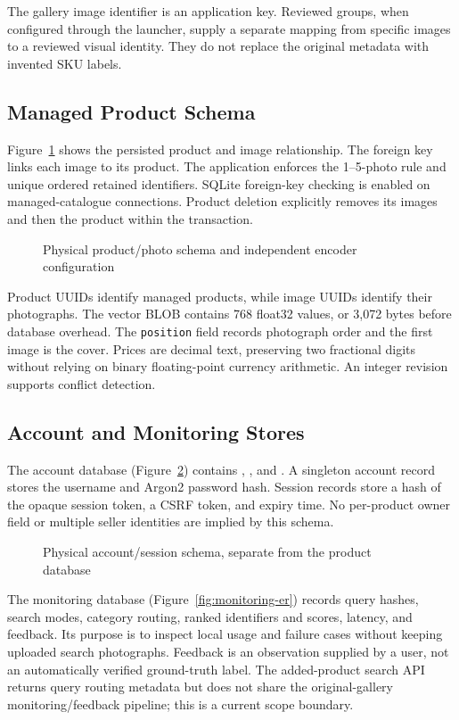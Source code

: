 The gallery image identifier is an application key. Reviewed groups, when
configured through the launcher, supply a separate mapping from specific images
to a reviewed visual identity. They do not replace the original metadata with
invented SKU labels.

\subsection{Managed Product Schema}
Figure~\ref{fig:product-er} shows the persisted product and image relationship.
The foreign key links each image to its product. The application enforces the
1--5-photo rule and unique ordered retained identifiers. SQLite foreign-key
checking is enabled on managed-catalogue connections. Product deletion explicitly
removes its images and then the product within the transaction.

\begin{figure}[H]\centering
\caption{Physical product/photo schema and independent encoder configuration}
\label{fig:product-er}\end{figure}

Product UUIDs identify managed products, while image UUIDs identify their
photographs. The vector BLOB contains 768 float32 values, or 3,072 bytes before
database overhead. The \texttt{position} field records photograph order and the
first image is the cover. Prices are decimal text, preserving two fractional
digits without relying on binary floating-point currency arithmetic. An
integer revision supports conflict detection.

\subsection{Account and Monitoring Stores}
The account database (Figure~\ref{fig:auth-schema}) contains ,
, and . A singleton
account record stores the username and Argon2 password hash. Session records
store a hash of the opaque session token, a CSRF token, and expiry time. No
per-product owner field or multiple seller identities are implied by this schema.

\begin{figure}[H]\centering
\caption{Physical account/session schema, separate from the product database}
\label{fig:auth-schema}\end{figure}

The monitoring database (Figure~\ref{fig:monitoring-er}) records query hashes, search modes, category routing,
ranked identifiers and scores, latency, and feedback. Its purpose is to inspect
local usage and failure cases without keeping uploaded search photographs.
Feedback is an observation supplied by a user, not an automatically verified
ground-truth label. The added-product search API returns query routing metadata
but does not share the original-gallery monitoring/feedback pipeline; this is
a current scope boundary.

